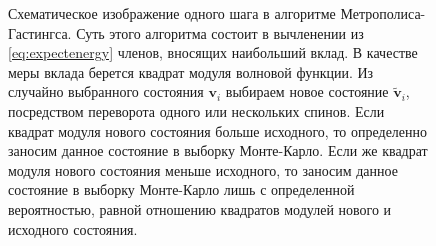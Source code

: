 {
    \begin{figure}[b!]
        \begin{center}
        \end{center}
        \caption{Схематическое изображение одного шага в алгоритме Метрополиса-Гастингса. 
                 Суть этого алгоритма состоит в вычленении из \eqref{eq:expectenergy} членов, вносящих наибольший вклад.
                 В качестве меры вклада берется квадрат модуля волновой функции.
                 Из случайно выбранного состояния $ \mathbf{v}_i $ выбираем новое состояние $ \tilde{\mathbf{v}}_i $, посредством переворота одного или нескольких спинов.
                 Если квадрат модуля нового состояния больше исходного, то определенно заносим данное состояние в выборку Монте-Карло.
                 Если же квадрат модуля нового состояния меньше исходного, то заносим данное состояние в выборку Монте-Карло лишь с определенной вероятностью, 
                 равной отношению квадратов модулей нового и исходного состояния.
        }
        \label{fig:MH}
    \end{figure}
}

